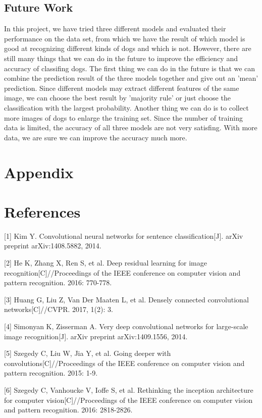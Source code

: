 \documentclass{article}
\begin{document}
\subsection{Future Work}
In this project, we have tried three different models and evaluated their performance on the data set, from which we have the result of which model is good at recognizing different kinds of dogs and which is not. However, there are still many things that we can do in the future to improve the efficiency and accuracy of classifing dogs. The first thing we can do in the future is that we can combine the prediction result of the three models together and give out an 'mean' prediction. Since different models may extract different features of the same image, we can choose the best result by 'majority rule' or just choose the classification with the largest probability. 
Another thing we can do is to collect more images of dogs to enlarge the training set. Since the number of training data is limited, the accuracy of all three models are not very satisfing. With more data, we are sure we can improve the accuracy much more.
\section{Appendix}


\section*{References}

\medskip

\small

[1] Kim Y. Convolutional neural networks for sentence classification[J]. arXiv preprint arXiv:1408.5882, 2014.

[2] He K, Zhang X, Ren S, et al. Deep residual learning for image recognition[C]//Proceedings of the IEEE conference on computer vision and pattern recognition. 2016: 770-778.

[3] Huang G, Liu Z, Van Der Maaten L, et al. Densely connected convolutional networks[C]//CVPR. 2017, 1(2): 3.

[4] Simonyan K, Zisserman A. Very deep convolutional networks for large-scale image recognition[J]. arXiv preprint arXiv:1409.1556, 2014.

[5] Szegedy C, Liu W, Jia Y, et al. Going deeper with convolutions[C]//Proceedings of the IEEE conference on computer vision and pattern recognition. 2015: 1-9.

[6] Szegedy C, Vanhoucke V, Ioffe S, et al. Rethinking the inception architecture for computer vision[C]//Proceedings of the IEEE conference on computer vision and pattern recognition. 2016: 2818-2826.
\end{document}
